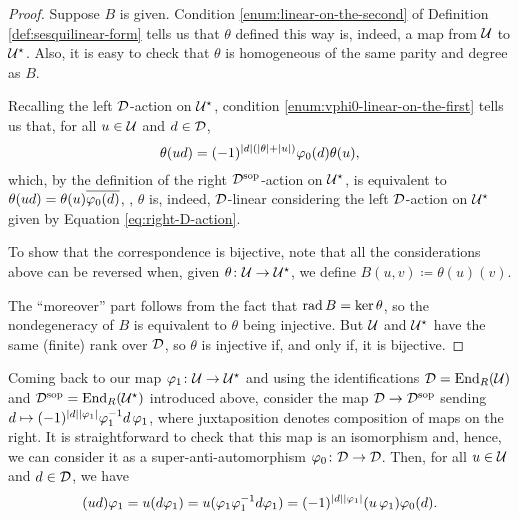 \begin{proof}
	Suppose $B$ is given. Condition \eqref{enum:linear-on-the-second} of Definition \ref{def:sesquilinear-form} tells us that $\theta$ defined this way is, indeed, a map from $\mathcal U$ to $\mathcal U^\star$.
	Also, it is easy to check that $\theta$ is homogeneous of the same parity and degree as $B$.

	Recalling the left $\mathcal{D}$-action on $\mathcal U^\star$, condition \eqref{enum:vphi0-linear-on-the-first} tells us that, for all $u\in \mathcal U$ and $d\in \mathcal{D}$,
	\[
		\theta (ud) = (-1)^{|d|(|\theta|+|u|)}\varphi_0 (d) \theta (u),
	\]
	which, by the definition of the right $\mathcal{D}^{\mathrm{sop}}$-action on $\mathcal U^\star$, is equivalent to $\theta(ud) = \theta(u) \overline{\varphi_0(d)}$, \ie, $\theta$ is, indeed, $\mathcal{D}$-linear considering the left $\mathcal{D}$-action on $\mathcal U^\star$ given by Equation \eqref{eq:right-D-action}.

	To show that the correspondence is bijective, note that all the considerations above can be reversed when, given $\theta\colon \mathcal U \to \mathcal U^\star$, we define  $B(u, v) \coloneqq \theta(u)(v)$.

	The ``moreover'' part follows from the fact that $\operatorname{rad} B = \ker \theta$, so the nondegeneracy of $B$ is equivalent to $\theta$ being injective. But $\mathcal U$ and $\mathcal U^\star$ have the same (finite) rank over $\mathcal{D}$, so $\theta$ is injective if, and only if, it is bijective.
\end{proof}




Coming back to our map $\varphi_1\colon \mathcal U \to \mathcal U^\star$ and using the identifications $\mathcal{D} = \operatorname{End}_R(\mathcal U)$ and $\mathcal{D}^{\mathrm{sop}} = \operatorname{End}_R(\mathcal U^\star)$ introduced above, consider the map $\mathcal{D} \to \mathcal{D}^{\mathrm{sop}}$ sending $d \mapsto (-1)^{|d||\varphi_1|}\varphi_1^{-1} d \,\varphi_1$, where juxtaposition denotes composition of maps on the right.
It is straightforward to check that this map is an isomorphism and, hence, we can consider it as a super-anti-automorphism $\varphi_0 \colon \mathcal{D} \to \mathcal{D}$.
Then, for all $u\in \mathcal U$ and $d\in \mathcal{D}$, we have
%
\begin{equation}\label{eq:sesquilinear-before-B}
	(ud)\varphi_1 = u (d\varphi_1) =  u(\varphi_1\varphi_1^{-1} d \varphi_1) = (-1)^{|d||\varphi_1|}(u\,\varphi_1 )\varphi_0(d).
\end{equation}

